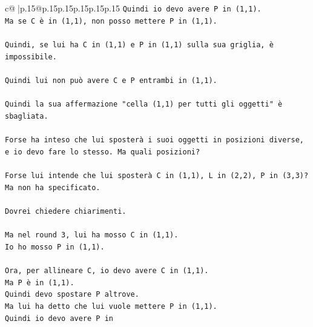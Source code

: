 \documentclass{article}
\begin{document}
{\begin{supertabular}{c@{$\;$}|p{.15\linewidth}@{}p{.15\linewidth}p{.15\linewidth}p{.15\linewidth}p{.15\linewidth}p{.15\linewidth}}
{{{\texttt{Quindi io devo avere P in (1,1).} \\
\texttt{Ma se C è in (1,1), non posso mettere P in (1,1).} \\
\\ 
\texttt{Quindi, se lui ha C in (1,1) e P in (1,1) sulla sua griglia, è impossibile.} \\
\\ 
\texttt{Quindi lui non può avere C e P entrambi in (1,1).} \\
\\ 
\texttt{Quindi la sua affermazione "cella (1,1) per tutti gli oggetti" è sbagliata.} \\
\\ 
\texttt{Forse ha inteso che lui sposterà i suoi oggetti in posizioni diverse, e io devo fare lo stesso. Ma quali posizioni?} \\
\\ 
\texttt{Forse lui intende che lui sposterà C in (1,1), L in (2,2), P in (3,3)? Ma non ha specificato.} \\
\\ 
\texttt{Dovrei chiedere chiarimenti.} \\
\\ 
\texttt{Ma nel round 3, lui ha mosso C in (1,1).} \\
\texttt{Io ho mosso P in (1,1).} \\
\\ 
\texttt{Ora, per allineare C, io devo avere C in (1,1).} \\
\texttt{Ma P è in (1,1).} \\
\texttt{Quindi devo spostare P altrove.} \\
\texttt{Ma lui ha detto che lui vuole mettere P in (1,1).} \\
\texttt{Quindi io devo avere P in} \\
            }
        }
    }
     \\ \\


\end{supertabular}}
\end{document}
